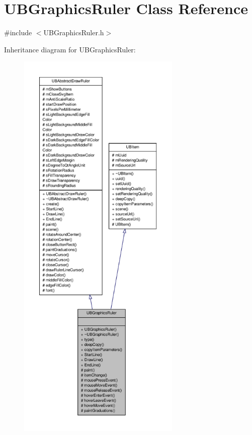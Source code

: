 \hypertarget{class_u_b_graphics_ruler}{\section{U\-B\-Graphics\-Ruler Class Reference}
\label{db/dd7/class_u_b_graphics_ruler}
}


{\ttfamily \#include $<$U\-B\-Graphics\-Ruler.\-h$>$}



Inheritance diagram for U\-B\-Graphics\-Ruler\-:
\nopagebreak
\begin{figure}[H]
\begin{center}
\leavevmode
\includegraphics[height=550pt]{d3/d39/class_u_b_graphics_ruler__inherit__graph}
\end{center}
\end{figure}


